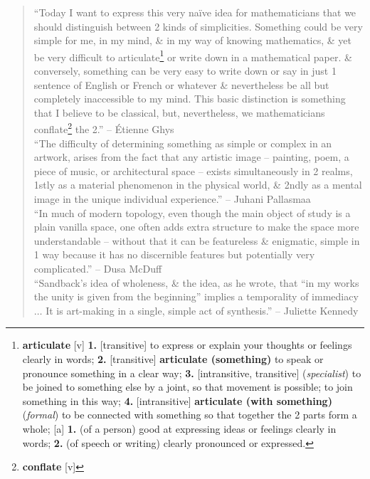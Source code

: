 \documentclass[oneside]{book}
\numberwithin{equation}{section}
\begin{document}
\begin{quotation}
	``Today I want to express this very na\"ive idea for mathematicians that we should distinguish between 2 kinds of simplicities. Something could be very simple for me, in my mind, \& in my way of knowing mathematics, \& yet be very difficult to articulate\footnote{\textbf{articulate} [v] \textbf{1.} [transitive] to express or explain your thoughts or feelings clearly in words; \textbf{2.} [transitive] \textbf{articulate (something)} to speak or pronounce something in a clear way; \textbf{3.} [intransitive, transitive] (\textit{specialist}) to be joined to something else by a joint, so that movement is possible; to join something in this way; \textbf{4.} [intransitive] \textbf{articulate (with something)} (\textit{formal}) to be connected with something so that together the 2 parts form a whole; [a] \textbf{1.} (of a person) good at expressing ideas or feelings clearly in words; \textbf{2.} (of speech or writing) clearly pronounced or expressed.} or write down in a mathematical paper. \& conversely, something can be very easy to write down or say in just 1 sentence of English or French or whatever \& nevertheless be all but completely inaccessible to my mind. This basic distinction is something that I believe to be classical, but, nevertheless, we mathematicians conflate\footnote{\textbf{conflate} [v]} the 2.'' -- \'Etienne Ghys\\
	
	``The difficulty of determining something as simple or complex in an artwork, arises from the fact that any artistic image -- painting, poem, a piece of music, or architectural space -- exists simultaneously in 2 realms, 1stly as a material phenomenon in the physical world, \& 2ndly as a mental image in the unique individual experience.'' -- Juhani Pallasmaa\\
	
	``In much of modern topology, even though the main object of study is a plain vanilla space, one often adds extra structure to make the space more understandable -- without that it can be featureless \& enigmatic, simple in 1 way because it has no discernible features but potentially very complicated.'' -- Dusa McDuff\\
	
	``Sandback's idea of wholeness, \& the idea, as he wrote, that ``in my works the unity is given from the beginning'' implies a temporality of immediacy $\ldots$ It is art-making in a single, simple act of synthesis.'' -- Juliette Kennedy\\
	

\end{quotation}
\end{document}
